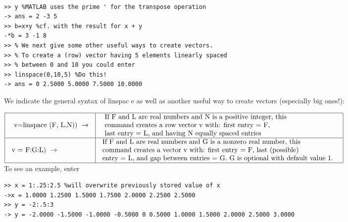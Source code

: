 \documentclass[../main.tex]{subfiles}
\begin{document}
\begin{verbatim}

>> y %MATLAB uses the prime ' for the transpose operation
-> ans = 2 -3 5
>> b=x+y %cf. with the result for x + y
-*b = 3 -1 8
>> % We next give some other useful ways to create vectors.
>> % To create a (row) vector having 5 elements linearly spaced
>> % between 0 and 10 you could enter
>> linspace(0,10,5) %Do this!
-> ans = 0 2.5000 5.0000 7.5000 10.0000 
\end{verbatim}

We indicate the general syntax of linspac e as well as another useful way to
create vectors (especially big ones!):



$
\begin{array}{|l|l|}
\hline \begin{array}{l}
\text { v=linspace (F, L,N)) } \rightarrow \\
\end{array} & \begin{array}{l}
\text { If F and L are real numbers and N is a positive integer, this } \\
\text { command creates a row vector v with: first entry = F, }\\
\text { last entry = L, and having N equally spaced entries}
\end{array} \\
\hline \begin{array}{l}
\text {v = F:G:L) } \rightarrow \\
\end{array} & \begin{array}{l}
\text {If F and L are real numbers and G is a nonzero real number, this } \\
\text {command creates a vector v with: first entry = F, last (possible) }\\
\text {entry = L, and gap between entries = G. G is optional with default value 1. }
\end{array} \\
\hline
\end{array}
$\\



To see an example, enter
\begin{verbatim}
>> x = 1:.25:2.5 %will overwrite previously stored value of x
->x = 1.0000 1.2500 1.5000 1.7500 2.0000 2.2500 2.5000
>> y = -2:.5:3
-> y = -2.0000 -1.5000 -1.0000 -0.5000 0 0.5000 1.0000 1.5000 2.0000 2.5000 3.0000
\end{verbatim}
\end{document}
